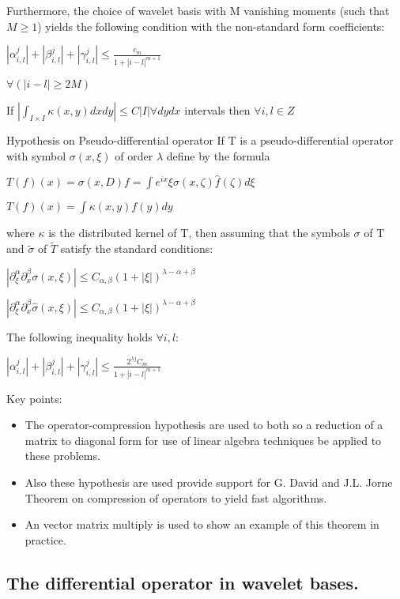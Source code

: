 \documentclass[11pt]{article}
\begin{document}
Furthermore, the choice of wavelet basis with M vanishing moments (such that $M \ge 1$) 
yields the following condition with the non-standard form coefficients:

$|\alpha ^j _{i,l}| + |\beta^j _{i,l}| + |\gamma^j _{i,l}| \le
 \frac{c_m}{1+|i-l|^{m+1}}$

$\forall (|i-l|\ge 2M)$

If $  | \int_{I\times I} \kappa (x,y) dxdy | \le C|I| \forall dydx    $
intervals then $\forall i,l \in Z$ 


Hypothesis on Pseudo-differential operator
If T is a pseudo-differential operator with symbol $\sigma (x, \xi )$ of order $\lambda$ define by the formula 

$ T(f)(x) = \sigma(x,D)f = \int e^{ix} \xi \sigma (x,\zeta) \hat{f}(\zeta) d\xi $

$T(f)(x) = \int \kappa (x,y) f(y)dy $

where $\kappa$ is the distributed kernel of T, then assuming that the symbols $\sigma$ of T and $\tilde{\sigma}$ of $\tilde{T}$ satisfy the standard conditions:

$|\partial ^\alpha _\xi \partial ^\beta _x \sigma (x,\xi)| \le C_{\alpha , \beta} (1+|\xi |)^{\lambda - \alpha + \beta}$

$ | \partial ^\alpha _\xi \partial ^\beta _x \hat{\sigma} ( x , \xi ) | \le C_{\alpha , \beta} (1 + |\xi | )^{\lambda -\alpha + \beta}  $

The following inequality holds $\forall i,l$:

$ |\alpha ^j _{i,l} | + | \beta ^j _{i,l} | +  |\gamma ^j _{i,l}| \le \frac {2^{\lambda j}  C_m } {1 + |i-l| ^{m+1}} $
 
 
Key points:
\begin{itemize}
\item The operator-compression hypothesis are used to both so a reduction of a matrix to diagonal form for use of linear algebra techniques be applied to these problems.  
\item Also these hypothesis are used provide support for G. David and J.L. Jorne Theorem on compression of operators to yield fast algorithms.
\item An vector matrix multiply is used to show an example of this theorem in practice.  
\end{itemize}


\subsection {The differential operator in wavelet bases.}
\end{document}
